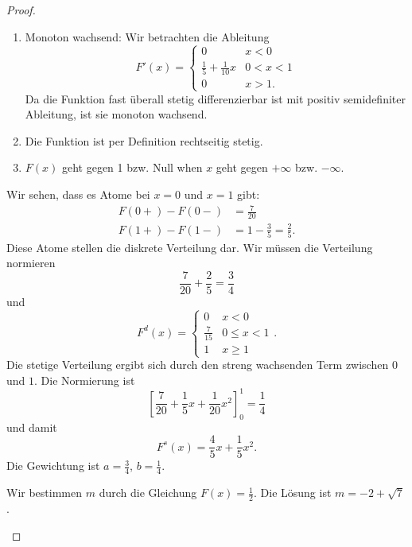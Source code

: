 \begin{proof}
	\begin{parts}
		\item \begin{enumerate}[label=(\arabic*)]
			\item Monoton wachsend: Wir betrachten die Ableitung
			\[F'(x)=\begin{cases}
				0 & x < 0\\
				\frac 15 + \frac{1}{10} x & 0 < x < 1\\
				0 & x > 1.
			\end{cases}\]
			Da die Funktion fast überall stetig differenzierbar ist mit positiv semidefiniter Ableitung, ist sie monoton wachsend.
			\item Die Funktion ist per Definition rechtseitig stetig.
			\item $F(x)$ geht gegen 1 bzw. Null when $x$ geht gegen $+\infty$ bzw. $-\infty$.
		\end{enumerate}
		\item Wir sehen, dass es Atome bei $x=0$ und $x=1$ gibt:
		\begin{align*}
			F(0+)-F(0-)&=\frac{7}{20}\\
			F(1+)-F(1-)&=1-\frac{3}{5}=\frac{2}{5}.
		\end{align*}
		Diese Atome stellen die diskrete Verteilung dar. Wir müssen die Verteilung normieren
		\[\frac{7}{20}+\frac{2}{5}=\frac{3}{4}\]
		und
		\[F^d(x)=\begin{cases}
			0 & x < 0\\
			\frac{7}{15} & 0 \le x < 1\\
			1 & x \ge 1
		\end{cases}.\]
		Die stetige Verteilung ergibt sich durch den streng wachsenden Term zwischen $0$ und $1$. Die Normierung ist
		\[\left[\frac{7}{20}+\frac{1}{5}x+\frac{1}{20}x^2\right]_{0}^1=\frac 14\]
		und damit
		\[F^s(x)=\frac{4}{5}x+\frac{1}{5}x^2.\]
		Die Gewichtung ist $a=\frac 34$, $b=\frac 14$.
		\item Wir bestimmen $m$ durch die Gleichung $F(x)=\frac 12$. Die L\"{o}sung ist $m=-2+\sqrt{7}$.\qedhere
	\end{parts}
\end{proof}